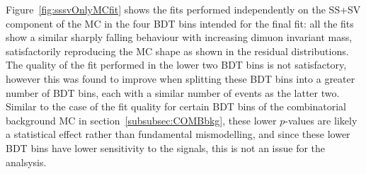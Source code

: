 Figure~\ref{fig:sssvOnlyMCfit} shows the fits performed independently on the SS+SV component of the \bbmumuX MC in the four BDT bins intended for the final fit: all the fits show a similar sharply falling behaviour with increasing dimuon invariant mass, satisfactorily reproducing the MC shape as shown in the residual distributions. The quality of the fit performed in the lower two BDT bins is not satisfactory, however this was found to improve when splitting these BDT bins into a greater number of BDT bins, each with a similar number of events as the latter two. Similar to the case of the fit quality for certain BDT bins of the combinatorial background MC in section~\ref{subsubsec:COMBbkg}, these lower $p$-values are likely a statistical effect rather than fundamental mismodelling, and since these lower BDT bins have lower sensitivity to the signals, this is not an issue for the analsysis.

